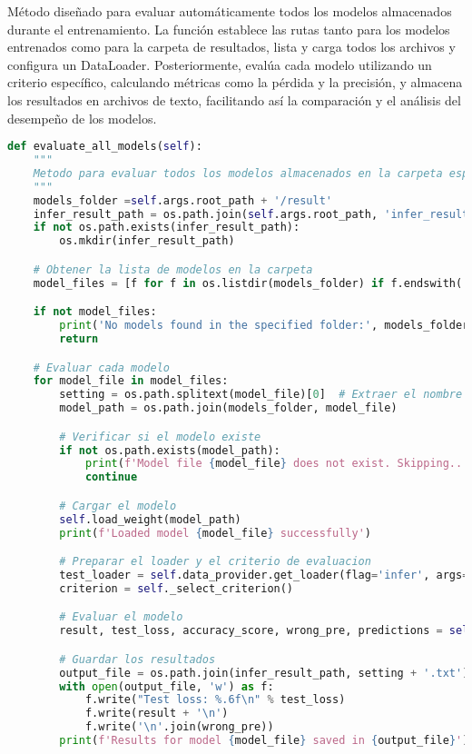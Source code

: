 Método diseñado para evaluar automáticamente todos los modelos almacenados durante el entrenamiento. La función establece las rutas tanto para los modelos entrenados como para la carpeta de resultados, lista y carga todos los archivos y configura un DataLoader. Posteriormente, evalúa cada modelo utilizando un criterio específico, calculando métricas como la pérdida y la precisión, y almacena los resultados en archivos de texto, facilitando así la comparación y el análisis del desempeño de los modelos.

\begin{lstlisting}[language=Python, caption={Función para evaluar de forma automatizada todos los modelos almacenados.}]
    def evaluate_all_models(self):
    """
    Metodo para evaluar todos los modelos almacenados en la carpeta especificada.
    """
    models_folder =self.args.root_path + '/result'
    infer_result_path = os.path.join(self.args.root_path, 'infer_result')
    if not os.path.exists(infer_result_path):
        os.mkdir(infer_result_path)

    # Obtener la lista de modelos en la carpeta
    model_files = [f for f in os.listdir(models_folder) if f.endswith('.pth')]

    if not model_files:
        print('No models found in the specified folder:', models_folder)
        return

    # Evaluar cada modelo
    for model_file in model_files:
        setting = os.path.splitext(model_file)[0]  # Extraer el nombre base del modelo
        model_path = os.path.join(models_folder, model_file)

        # Verificar si el modelo existe
        if not os.path.exists(model_path):
            print(f'Model file {model_file} does not exist. Skipping...')
            continue

        # Cargar el modelo
        self.load_weight(model_path)
        print(f'Loaded model {model_file} successfully')

        # Preparar el loader y el criterio de evaluacion
        test_loader = self.data_provider.get_loader(flag='infer', args=self.args)
        criterion = self._select_criterion()

        # Evaluar el modelo
        result, test_loss, accuracy_score, wrong_pre, predictions = self.test(test_loader, criterion)

        # Guardar los resultados
        output_file = os.path.join(infer_result_path, setting + '.txt')
        with open(output_file, 'w') as f:
            f.write("Test loss: %.6f\n" % test_loss)
            f.write(result + '\n')
            f.write('\n'.join(wrong_pre))
        print(f'Results for model {model_file} saved in {output_file}')
\end{lstlisting}